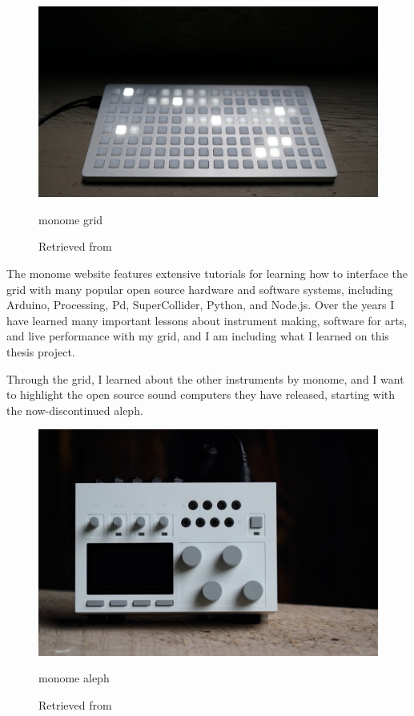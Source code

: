 \begin{figure}[ht]
  \centering
  \includegraphics[width=0.75\linewidth,height=0.25\textheight,keepaspectratio]{images/monome-grid.jpg}
  \caption{monome grid}
  \caption*{Retrieved from \cite{website-monome-current}}
  \label{fig:monome-grid}
\end{figure}

The monome website features extensive tutorials for learning how to interface the grid with many popular open source hardware and software systems, including Arduino, Processing, \acrshort{Pd}, SuperCollider, Python, and Node.js. Over the years I have learned many important lessons about instrument making, software for arts, and live performance with my grid, and I am including what I learned on this thesis project.

Through the grid, I learned about the other instruments by monome, and I want to highlight the open source sound computers they have released, starting with the now-discontinued aleph.

\begin{figure}[ht]
  \centering
  \includegraphics[width=0.75\linewidth,height=0.25\textheight,keepaspectratio]{images/monome-aleph.jpg}
  \caption{monome aleph}
  \caption*{Retrieved from \cite{website-monome-current}}
  \label{fig:monome-aleph}
\end{figure}

